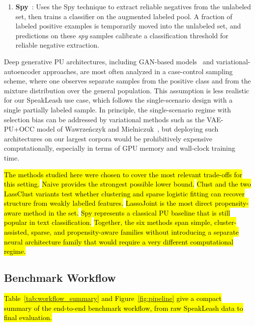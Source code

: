 \documentclass[applsci,article,submit,pdftex,moreauthors]{Definitions/mdpi}
\newcommand{\rev}[1]{\hl{#1}}
\begin{document}
\begin{enumerate}
\item \textbf{Spy}~\cite{liu2002spy}: Uses the Spy technique to extract reliable negatives from the unlabeled set, then trains a classifier on the augmented labeled pool. A fraction of labeled positive examples is temporarily moved into the unlabeled set, and predictions on these \emph{spy} samples calibrate a classification threshold for reliable negative extraction.
\end{enumerate}

Deep generative PU architectures, including GAN-based models~\cite{hou_genpu} and variational-autoencoder approaches, are most often analyzed in a case-control sampling scheme, where one observes separate samples from the positive class and from the mixture distribution over the general population. This assumption is less realistic for our SpeakLeash use case, which follows the single-scenario design with a single partially labeled sample. In principle, the single-scenario regime with selection bias can be addressed by variational methods such as the VAE-PU+OCC model of Wawrze\'{n}czyk and Mielniczuk~\cite{wawrzenczyk_puvae}, but deploying such architectures on our largest corpora would be prohibitively expensive computationally, especially in terms of GPU memory and wall-clock training time.

\rev{The methods studied here were chosen to cover the most relevant trade-offs for this setting.} \rev{Naive provides the strongest possible lower bound.} \rev{Clust and the two LassClust variants test whether clustering and sparse logistic fitting can recover structure from weakly labelled features.} \rev{LassoJoint is the most direct propensity-aware method in the set.} \rev{Spy represents a classical PU baseline that is still popular in text classification.} \rev{Together, the six methods span simple, cluster-assisted, sparse, and propensity-aware families without introducing a separate neural architecture family that would require a very different computational regime.}

\subsection{Benchmark Workflow}

\rev{Table~\ref{tab:workflow_summary} and Figure~\ref{fig:pipeline} give a compact summary of the end-to-end benchmark workflow, from raw SpeakLeash data to final evaluation.}
\end{document}
